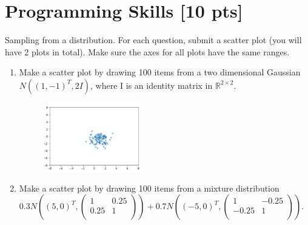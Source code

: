 \documentclass[a4paper]{article}
\theoremstyle{definition}
\newenvironment{soln}{
	\leavevmode\color{blue}\ignorespaces
}{}
\begin{document}
	\section{Programming Skills [10 pts]}
	Sampling from a distribution.  For each question, submit a scatter plot (you will have 2 plots in total).  Make sure the axes for all plots have the same ranges.
	\begin{enumerate}
		\item Make a scatter plot by drawing 100 items from a two dimensional Gaussian $N((1, -1)^{T}, 2I)$, where I is an identity matrix in $\mathbb{R}^{2 \times 2}$.
		
			\begin{soln}
			\begin{figure}[h!]
			    \centering
			    \includegraphics[width=0.4\textwidth]{Figure4.png}  
			    \captionsetup{labelformat=empty}
			    \caption{}
			    \label{fig:my_label}
			\end{figure}
		\end{soln}
	
		\item Make a scatter plot by drawing 100 items from a mixture distribution 
		$0.3 N\left((5, 0)^{T}, \begin{pmatrix} 1 & 0.25 \\ 0.25 & 1\\ \end{pmatrix}\right)
		+0.7 N\left((-5, 0)^{T}, \begin{pmatrix} 1 & -0.25 \\ -0.25 & 1\\ \end{pmatrix}\right)
		$.
		

\end{enumerate}
\end{document}
